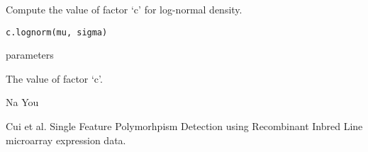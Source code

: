 \begin{Description}\relax
Compute the value of factor `c' for log-normal density.
\end{Description}
\begin{Usage}
\begin{verbatim}
c.lognorm(mu, sigma)
\end{verbatim}
\end{Usage}
\begin{Arguments}
\begin{ldescription}
\item[\code{mu,sigma}] parameters

\end{ldescription}
\end{Arguments}
\begin{Value}
The value of factor `c'.
\end{Value}
\begin{Author}\relax
Na You
\end{Author}
\begin{References}\relax
Cui et al.
Single Feature Polymorhpism Detection using Recombinant Inbred Line
microarray expression data.
\end{References}

